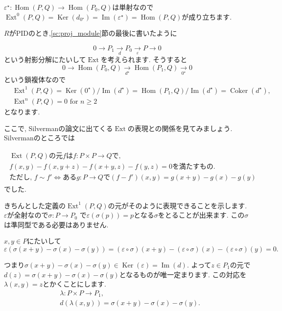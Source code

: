 \documentclass{jsarticle}
\newcommand{\makeop}[1]{\mathop{\mathrm{#1}}\nolimits}
\def\Im{\makeop{Im}}
\def\Ker{\makeop{Ker}}
\def\Hom{\makeop{Hom}}
\def\Ext{\makeop{Ext}}
\def\Coker{\makeop{Coker}}
\theoremstyle{definition}
\numberwithin{theorem}{section}
\begin{document}
$\varepsilon^\star: \Hom(P, Q) \rightarrow \Hom(P_0, Q)$は単射なので
$\Ext^0(P, Q) = \Ker(d_{0^\star}) = \Im(\varepsilon^\star) = \Hom(P, Q)$が成り立ちます.

$R$がPIDのとき,\ref{sc:proj_module}節の最後に書いたように

\[
0 \rightarrow P_1 \xrightarrow[d]{} P_0 \xrightarrow[\varepsilon]{} P \rightarrow 0
\]
という射影分解にたいして$\Ext$を考えられます. そうすると
\[
0 \rightarrow \Hom(P_0, Q) \xrightarrow[d^\star]{} \Hom(P_1, Q) \xrightarrow[0^\star]{} 0
\]
という鎖複体なので
\begin{align*}
& \Ext^1(P, Q) = \Ker(0^\star)/\Im(d^\star) = \Hom(P_1, Q)/\Im(d^\star) = \Coker(d^\star),\\
& \Ext^n(P, Q) = 0  \text{ for } n \geq 2
\end{align*}
となります.

ここで, Silvermanの論文に出てくる$\Ext$の表現との関係を見てみましょう. Silvermanのところでは

\begin{eqnarray}
\label{eq:silverman_ext_def}
\begin{array}{l}
\Ext(P, Q)\mbox{の元}fはf: P\times P \rightarrow Qで, \\
f(x, y) - f(x, y+z) - f(x+y, z) - f(y, z) = 0\mbox{を満たすもの.}\\
\mbox{ただし, }f\sim f' \Leftrightarrow ある g:P\rightarrow Qで(f-f')(x, y) = g(x+y) - g(x) - g(y)
\end{array}
\end{eqnarray}
でした.

きちんとした定義の$\Ext^1(P, Q)$の元がそのように表現できることを示します. $\varepsilon$が全射なので$\sigma : P \rightarrow P_0$
で$\varepsilon(\sigma(p)) = p$となる$\sigma$をとることが出来ます. この$\sigma$は準同型である必要はありません.

$x, y \in P$にたいして
\[
\varepsilon(\sigma(x+y) - \sigma(x) - \sigma(y)) = (\varepsilon\circ\sigma)(x+y) - (\varepsilon\circ\sigma)(x) - (\varepsilon\circ\sigma)(y) = 0.
\]

つまり$\sigma(x+y) - \sigma(x) - \sigma(y) \in \Ker(\varepsilon) = \Im(d)$. よって$z\in P_1$の元で
$d(z) = \sigma(x+y) - \sigma(x) - \sigma(y)$となるものが唯一定まります. この対応を$\lambda(x, y) = z$とかくことにします.
\begin{align*}
& \lambda: P\times P \rightarrow P_1,\\
& d(\lambda(x, y)) = \sigma(x+y) - \sigma(x) - \sigma(y).
\end{align*}
\end{document}
